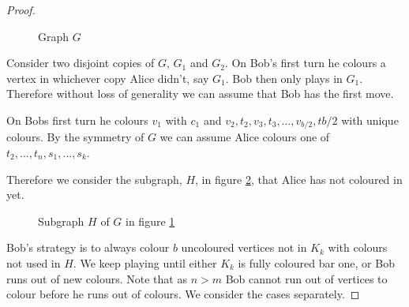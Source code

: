 \begin{proof}
\begin{figure}[H]
    \caption{Graph $G$}
\label{fig:pwlowerbound1}
\end{figure}

Consider two disjoint copies of $G$, $G_1$ and $G_2$. On Bob's first turn he colours a vertex in whichever copy Alice didn't, say $G_1$. Bob then only plays in $G_1$. Therefore without loss of generality we can assume that Bob has the first move.

On Bobs first turn he colours $v_1$ with $c_1$ and $v_2,t_2,v_3,t_3,\dots, v_{b/2}, t{b/2}$ with unique colours.
 By the symmetry of $G$ we can assume Alice colours one of $t_2,\dots,t_n,s_1,\dots,s_k$. 

Therefore we consider the subgraph, $H$, in figure \ref{fig:pwlowerbound2}, that Alice has not coloured in yet. 

\begin{figure}[H]
    \centering
{}
    \caption{Subgraph $H$ of $G$ in figure \ref{fig:pwlowerbound1}}
    \label{fig:pwlowerbound2}
\end{figure}


Bob's strategy is to always colour $b$ uncoloured vertices not in $K_k$ with colours not used in $H$. We keep playing until either $K_k$ is fully coloured bar one, or Bob runs out of new colours. Note that as $n>m$ Bob cannot run out of vertices to colour before he runs out of colours. We consider the cases separately. 


\end{proof}
